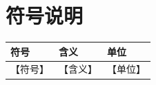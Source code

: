 \section{符号说明}
\begin{longtable}{lll}
\toprule
符号 & 含义 & 单位 \\
\midrule
\endhead
【符号】 & 【含义】 & 【单位】 \\
\bottomrule
\end{longtable}
